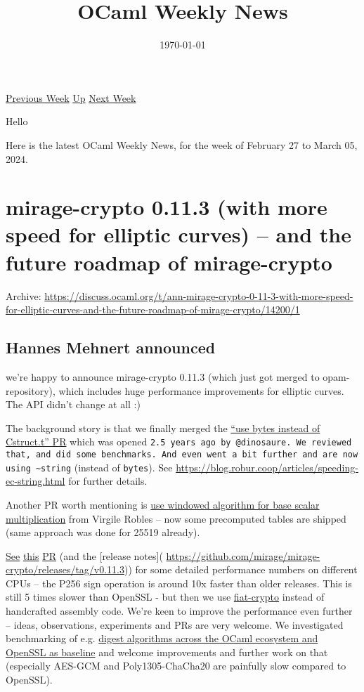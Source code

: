 \documentclass[11pt]{article}
\date{\today}
\title{OCaml Weekly News}
\begin{document}
\maketitle
\href{https://alan.petitepomme.net/cwn/2024.02.27.html}{Previous Week} \href{https://alan.petitepomme.net/cwn/index.html}{Up} \href{https://alan.petitepomme.net/cwn/2024.03.12.html}{Next Week}

Hello

Here is the latest OCaml Weekly News, for the week of February 27 to March 05, 2024.

\setcounter{tocdepth}{1}
\tableofcontents
\section*{mirage-crypto 0.11.3 (with more speed for elliptic curves) -- and the future roadmap of mirage-crypto}
\label{1}
Archive: \url{https://discuss.ocaml.org/t/ann-mirage-crypto-0-11-3-with-more-speed-for-elliptic-curves-and-the-future-roadmap-of-mirage-crypto/14200/1}
\subsection*{Hannes Mehnert announced}
\label{sec:org38175a6}


we're happy to announce mirage-crypto 0.11.3 (which just got merged to opam-repository), which includes huge performance improvements
for elliptic curves. The API didn't change at all :)

The background story is that we finally merged the \href{https://github.com/mirage/mirage-crypto/pull/146}{``use bytes instead of Cstruct.t''
PR} which was opened \texttt{2.5
years ago by @dinosaure.
We reviewed that, and did some
benchmarks. And even went a bit further and are now using
\textasciitilde{}string} (instead of \texttt{bytes}). See
\url{https://blog.robur.coop/articles/speeding-ec-string.html} for further details.

Another PR worth mentioning is \href{https://github.com/mirage/mirage-crypto/pull/191}{use windowed algorithm for base scalar
multiplication} from Virgile Robles -- now some precomputed tables are shipped
(same approach was done for 25519 already).

\href{https://github.com/mirage/mirage-crypto/pull/191}{See}
\href{https://github.com/mirage/mirage-crypto/pull/191\#issuecomment-1932003002}{this}
\href{https://github.com/mirage/mirage-crypto/pull/191\#issuecomment-1951836996}{PR} (and the [release notes](
\url{https://github.com/mirage/mirage-crypto/releases/tag/v0.11.3})) for some detailed performance numbers on different CPUs -- the P256
sign operation is around 10x faster than older releases. This is still 5 times slower than OpenSSL - but then we use
\href{https://github.com/mit-plv/fiat-crypto/}{fiat-crypto} instead of handcrafted assembly code. We're keen to improve the performance
even further -- ideas, observations, experiments and PRs are very welcome. We investigated benchmarking of e.g. \href{https://github.com/mirage/mirage-crypto/pull/202}{digest algorithms
across the OCaml ecosystem and OpenSSL as baseline} and welcome improvements and
further work on that (especially AES-GCM and Poly1305-ChaCha20 are painfully slow compared to OpenSSL).
\end{document}
